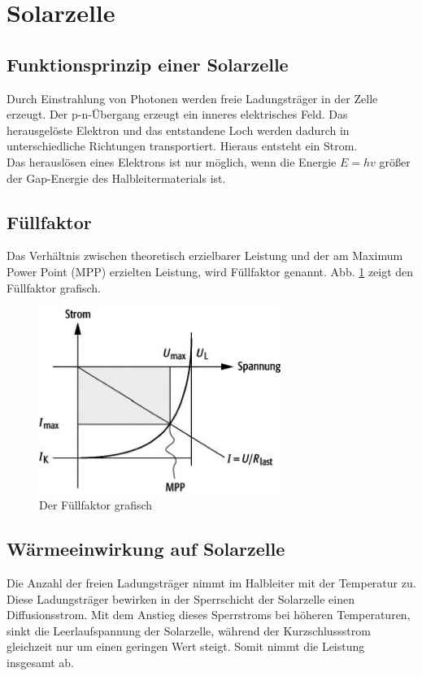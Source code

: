 \section{Solarzelle}

\subsection*{Funktionsprinzip einer Solarzelle}
Durch Einstrahlung von Photonen werden freie Ladungsträger in der Zelle erzeugt. Der p-n-Übergang erzeugt ein inneres elektrisches Feld. Das herausgelöste Elektron und das entstandene Loch werden dadurch in unterschiedliche Richtungen transportiert. Hieraus entsteht ein Strom.\\
Das herauslösen eines Elektrons ist nur möglich, wenn die Energie $E=hv$ größer der Gap-Energie des Halbleitermaterials ist.

\subsection*{Füllfaktor}
Das Verhältnis zwischen theoretisch erzielbarer Leistung und der am Maximum Power Point (MPP) erzielten Leistung, wird Füllfaktor genannt. 
Abb. \ref{fuell} zeigt den Füllfaktor grafisch.
\begin{figure}[htb]
	\centering
	\includegraphics[width=0.7\textwidth]{Abb/fuellfaktor.jpg}
	\caption{Der Füllfaktor grafisch}
	\label{fuell}
\end{figure}

\subsection*{Wärmeeinwirkung auf Solarzelle}
Die Anzahl der freien Ladungsträger nimmt im Halbleiter mit der Temperatur zu.
Diese Ladungsträger bewirken in der Sperrschicht der Solarzelle einen
Diffusionsstrom. Mit dem Anstieg dieses Sperrstroms bei höheren Temperaturen,
sinkt die Leerlaufspannung der Solarzelle, während der Kurzschlussstrom
gleichzeit nur um einen geringen Wert steigt. Somit nimmt die Leistung insgesamt
ab.

